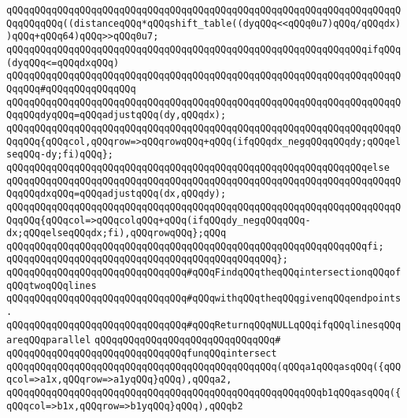 \verb|qQQqqQQqqQQqqQQqqQQqqQQqqQQqqQQqqQQqqQQqqQQqqQQqqQQqqQQqqQQqqQQqqQQqqQQqqQQqqQQq((distanceqQQq*qQQqshift_table((dyqQQq<<qQQq0u7)qQQq/qQQqdx))qQQq+qQQq64)qQQq>>qQQq0u7;|\newline
\newline
\verb|qQQqqQQqqQQqqQQqqQQqqQQqqQQqqQQqqQQqqQQqqQQqqQQqqQQqqQQqqQQqqQQqifqQQq(dyqQQq<=qQQqdxqQQq)|\newline
\verb|qQQqqQQqqQQqqQQqqQQqqQQqqQQqqQQqqQQqqQQqqQQqqQQqqQQqqQQqqQQqqQQqqQQqqQQqqQQq#qQQqqQQqqQQqqQQq|\newline
\verb|qQQqqQQqqQQqqQQqqQQqqQQqqQQqqQQqqQQqqQQqqQQqqQQqqQQqqQQqqQQqqQQqqQQqqQQqqQQqdyqQQq=qQQqadjustqQQq(dy,qQQqdx);|\newline
\verb|qQQqqQQqqQQqqQQqqQQqqQQqqQQqqQQqqQQqqQQqqQQqqQQqqQQqqQQqqQQqqQQqqQQqqQQqqQQq{qQQqcol,qQQqrow=>qQQqrowqQQq+qQQq(ifqQQqdx_negqQQqqQQqdy;qQQqelseqQQq-dy;fi)qQQq};|\newline
\verb|qQQqqQQqqQQqqQQqqQQqqQQqqQQqqQQqqQQqqQQqqQQqqQQqqQQqqQQqqQQqqQQqelse|\newline
\verb|qQQqqQQqqQQqqQQqqQQqqQQqqQQqqQQqqQQqqQQqqQQqqQQqqQQqqQQqqQQqqQQqqQQqqQQqqQQqdxqQQq=qQQqadjustqQQq(dx,qQQqdy);|\newline
\verb|qQQqqQQqqQQqqQQqqQQqqQQqqQQqqQQqqQQqqQQqqQQqqQQqqQQqqQQqqQQqqQQqqQQqqQQqqQQq{qQQqcol=>qQQqcolqQQq+qQQq(ifqQQqdy_negqQQqqQQq-dx;qQQqelseqQQqdx;fi),qQQqrowqQQq};qQQq|\newline
\verb|qQQqqQQqqQQqqQQqqQQqqQQqqQQqqQQqqQQqqQQqqQQqqQQqqQQqqQQqqQQqqQQqfi;|\newline
\verb|qQQqqQQqqQQqqQQqqQQqqQQqqQQqqQQqqQQqqQQqqQQqqQQq};|\newline
\newline
\verb|qQQqqQQqqQQqqQQqqQQqqQQqqQQqqQQq#qQQqFindqQQqtheqQQqintersectionqQQqofqQQqtwoqQQqlines|\newline
\verb|qQQqqQQqqQQqqQQqqQQqqQQqqQQqqQQq#qQQqwithqQQqtheqQQqgivenqQQqendpoints.|\newline
\verb|qQQqqQQqqQQqqQQqqQQqqQQqqQQqqQQq#qQQqReturnqQQqNULLqQQqifqQQqlinesqQQqareqQQqparallel|\newline
\verb|qQQqqQQqqQQqqQQqqQQqqQQqqQQqqQQq#|\newline
\verb|qQQqqQQqqQQqqQQqqQQqqQQqqQQqqQQqfunqQQqintersect|\newline
\verb|qQQqqQQqqQQqqQQqqQQqqQQqqQQqqQQqqQQqqQQqqQQqqQQq(qQQqa1qQQqasqQQq({qQQqcol=>a1x,qQQqrow=>a1yqQQq}qQQq),qQQqa2,|\newline
\verb|qQQqqQQqqQQqqQQqqQQqqQQqqQQqqQQqqQQqqQQqqQQqqQQqqQQqqQQqb1qQQqasqQQq({qQQqcol=>b1x,qQQqrow=>b1yqQQq}qQQq),qQQqb2|\newline
